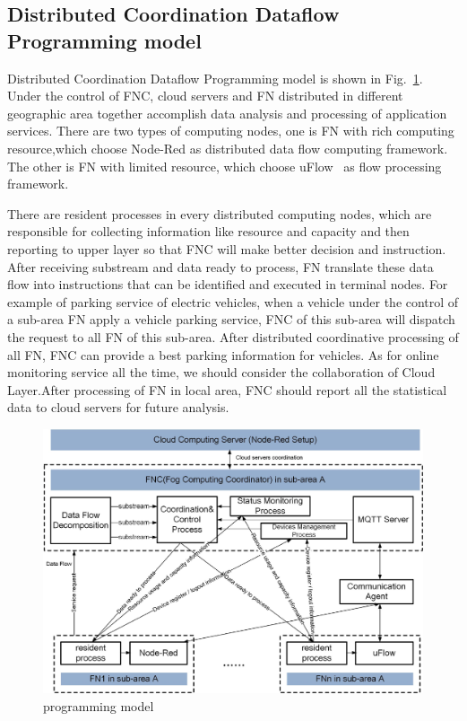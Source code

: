 \documentclass[conference]{IEEEtran}
\begin{document}
\subsection{Distributed Coordination Dataflow Programming model}
Distributed Coordination Dataflow Programming model is shown in Fig.~\ref{fig:Fig_3_programmingmodel}. Under the control of FNC, cloud servers and FN distributed in different geographic area together accomplish data analysis and processing of application services. There are two types of computing nodes, one is FN with rich computing resource,which choose Node-Red as distributed data flow computing framework. The other is FN with limited resource, which choose uFlow~\cite{Szydlo2017} as flow processing framework.

There are resident processes in every distributed computing nodes, which are responsible for collecting information like resource and capacity and then reporting to upper layer so that FNC will make better decision and instruction. After receiving substream and data ready to process, FN translate these data flow into instructions that can be identified and executed in terminal nodes. For example of parking service of electric vehicles, when a vehicle under the control of a sub-area FN apply a vehicle parking service, FNC of this sub-area will dispatch the request to all FN of this sub-area. After distributed coordinative processing of all FN, FNC can provide a best parking information for vehicles. As for online monitoring service all the time, we should consider the collaboration of Cloud Layer.After processing of FN in local area, FNC should report all the statistical data to cloud servers for future analysis.
\begin{figure}[h]
	\centering\includegraphics[width=3.4 in]{figures/Fig_3_programmingmodel} 
	\caption{programming model}\label{fig:Fig_3_programmingmodel} %
\end{figure}
\end{document}
